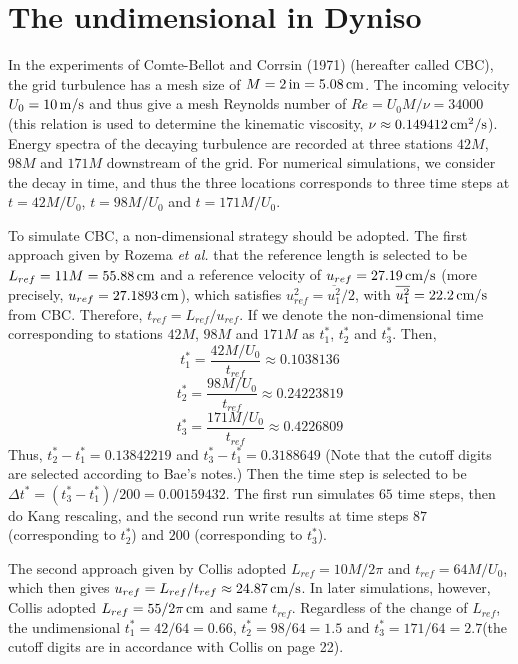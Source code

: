 \documentclass[10pt,a4paper]{article}
\begin{document}
\section{The undimensional in Dyniso}

In the experiments of Comte-Bellot and Corrsin (1971)\cite{comte-bellot1971} (hereafter called CBC), the grid turbulence has a mesh size of $M=2\,\rm{in}=5.08\,\rm{cm}$. The incoming velocity $U_0=10\,\rm{m/s}$ and thus give a mesh Reynolds number of $Re=U_0M/\nu=34000$ (this relation is used to determine the kinematic viscosity, $\nu\approx 0.149412\,\rm{cm^2/s}$). Energy spectra of the decaying turbulence are recorded at three stations $42M$, $98M$ and $171M$ downstream of the grid. For numerical simulations, we consider the decay in time, and thus the three locations corresponds to three time steps at $t=42M/U_0$, $t=98M/U_0$ and $t=171M/U_0$.


To simulate CBC, a non-dimensional strategy should be adopted. The first approach given by Rozema \textit{et al.}\cite{rozema2015,bae} that the reference length is selected to be $L_{ref}=11M=55.88\,\rm{cm}$ and a reference velocity of $u_{ref}=27.19\,\rm{cm/s}$ (more precisely, $u_{ref}=27.1893\,\rm{cm}$), which satisfies $u^2_{ref}=\overline{u^2_1}/2$, with $\overline{u^2_1}=22.2\,\rm{cm/s}$ from CBC. Therefore, $t_{ref}=L_{ref}/u_{ref}$. If we denote the non-dimensional time corresponding to stations $42M$, $98M$ and $171M$ as $t^*_1$, $t^*_2$ and $t^*_3$. Then, $$t^*_1=\frac{42M/U_0}{t_{ref}}\approx 0.1038136$$
$$t^*_2=\frac{98M/U_0}{t_{ref}}\approx 0.24223819$$
$$t^*_3=\frac{171M/U_0}{t_{ref}}\approx 0.4226809$$
Thus, $t^*_2-t^*_1=0.13842219$ and $t^*_3-t^*_1=0.3188649$ (Note that the cutoff digits are selected according to Bae's notes\cite{bae}.) Then the time step is selected to be $\Delta t^*=(t^*_3-t^*_1)/200=0.00159432$. The first run simulates $65$ time steps, then do Kang rescaling, and the second run write results at time steps $87$ (corresponding to $t^*_2$) and $200$ (corresponding to $t^*_3$).

The second approach given by Collis\cite{collis2002} adopted $L_{ref}=10M/2\pi$ and $t_{ref}=64M/U_0$, which then gives $u_{ref}=L_{ref}/t_{ref}\approx 24.87\,\rm{cm/s}$. In later simulations, however, Collis adopted $L_{ref}=55/2\pi\,\rm{cm}$ and same $t_{ref}$. Regardless of the change of $L_{ref}$, the undimensional $t^*_1=42/64=0.66$, $t^*_2=98/64=1.5$ and $t^*_3=171/64=2.7$(the cutoff digits are in accordance with Collis\cite{collis2002} on page 22).
\end{document}
